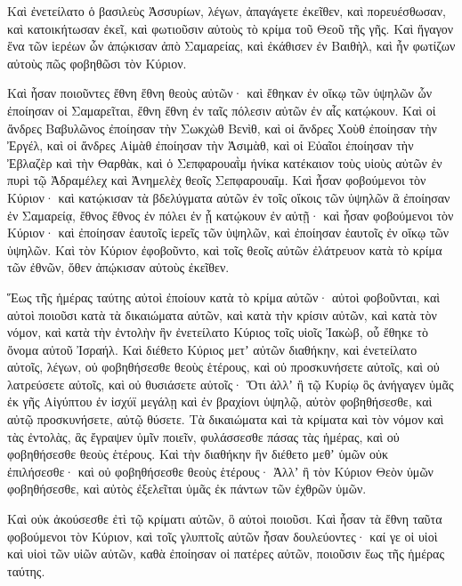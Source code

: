 {Καὶ ἐνετείλατο ὁ βασιλεὺς Ἀσσυρίων, λέγων, ἀπαγάγετε ἐκεῖθεν, καὶ πορευέσθωσαν, καὶ κατοικήτωσαν ἐκεῖ, καὶ φωτιοῦσιν αὐτοὺς τὸ κρίμα τοῦ Θεοῦ τῆς γῆς.
Καὶ ἤγαγον ἕνα τῶν ἱερέων ὧν ἀπῴκισαν ἀπὸ Σαμαρείας, καὶ ἐκάθισεν ἐν Βαιθὴλ, καὶ ἦν φωτίζων αὐτοὺς πῶς φοβηθῶσι τὸν Κύριον.
\par }{\PP {}Καὶ ἦσαν ποιοῦντες ἔθνη ἔθνη θεοὺς αὐτῶν· καὶ ἔθηκαν ἐν οἴκῳ τῶν ὑψηλῶν ὧν ἐποίησαν οἱ Σαμαρεῖται, ἔθνη ἔθνη ἐν ταῖς πόλεσιν αὐτῶν ἐν αἷς κατῴκουν.
Καὶ οἱ ἄνδρες Βαβυλῶνος ἐποίησαν τὴν Σωκχὼθ Βενὶθ, καὶ οἱ ἄνδρες Χοὺθ ἐποίησαν τὴν Ἐργέλ, καὶ οἱ ἄνδρες Αἱμὰθ ἐποίησαν τὴν Ἀσιμὰθ,
καὶ οἱ Εὐαῖοι ἐποίησαν τὴν Ἐβλαζὲρ καὶ τὴν Θαρθὰκ, καὶ ὁ Σεπφαρουαῒμ ἡνίκα κατέκαιον τοὺς υἱοὺς αὐτῶν ἐν πυρὶ τῷ Ἀδραμέλεχ καὶ Ἀνημελὲχ θεοῖς Σεπφαρουαΐμ.
Καὶ ἦσαν φοβούμενοι τὸν Κύριον· καὶ κατῴκισαν τὰ βδελύγματα αὐτῶν ἐν τοῖς οἴκοις τῶν ὑψηλῶν ἃ ἐποίησαν ἐν Σαμαρείᾳ, ἔθνος ἔθνος ἐν πόλει ἐν ᾗ κατῴκουν ἐν αὐτῇ· καὶ ἦσαν φοβούμενοι τὸν Κύριον· καὶ ἐποίησαν ἑαυτοῖς ἱερεῖς τῶν ὑψηλῶν, καὶ ἐποίησαν ἑαυτοῖς ἐν οἴκῳ τῶν ὑψηλῶν.
Καὶ τὸν Κύριον ἐφοβοῦντο, καὶ τοῖς θεοῖς αὐτῶν ἐλάτρευον κατὰ τὸ κρίμα τῶν ἐθνῶν, ὅθεν ἀπῴκισαν αὐτοὺς ἐκεῖθεν.
\par }{\PP {}Ἕως τῆς ἡμέρας ταύτης αὐτοὶ ἐποίουν κατὰ τὸ κρίμα αὐτῶν· αὐτοὶ φοβοῦνται, καὶ αὐτοὶ ποιοῦσι κατὰ τὰ δικαιώματα αὐτῶν, καὶ κατὰ τὴν κρίσιν αὐτῶν, καὶ κατὰ τὸν νόμον, καὶ κατὰ τὴν ἐντολὴν ἣν ἐνετείλατο Κύριος τοῖς υἱοῖς Ἰακὼβ, οὗ ἔθηκε τὸ ὄνομα αὐτοῦ Ἰσραήλ.
Καὶ διέθετο Κύριος μετʼ αὐτῶν διαθήκην, καὶ ἐνετείλατο αὐτοῖς, λέγων, οὐ φοβηθήσεσθε θεοὺς ἑτέρους, καὶ οὐ προσκυνήσετε αὐτοῖς, καὶ οὐ λατρεύσετε αὐτοῖς, καὶ οὐ θυσιάσετε αὐτοῖς·
Ὅτι ἀλλʼ ἢ τῷ Κυρίῳ ὃς ἀνήγαγεν ὑμᾶς ἐκ γῆς Αἰγύπτου ἐν ἰσχύϊ μεγάλῃ καὶ ἐν βραχίονι ὑψηλῷ, αὐτὸν φοβηθήσεσθε, καὶ αὐτῷ προσκυνήσετε, αὐτῷ θύσετε.
Τὰ δικαιώματα καὶ τὰ κρίματα καὶ τὸν νόμον καὶ τὰς ἐντολὰς, ἃς ἔγραψεν ὑμῖν ποιεῖν, φυλάσσεσθε πάσας τὰς ἡμέρας, καὶ οὐ φοβηθήσεσθε θεοὺς ἑτέρους.
Καὶ τὴν διαθήκην ἣν διέθετο μεθʼ ὑμῶν οὐκ ἐπιλήσεσθε· καὶ οὐ φοβηθήσεσθε θεοὺς ἑτέρους·
Ἀλλʼ ἢ τὸν Κύριον Θεὸν ὑμῶν φοβηθήσεσθε, καὶ αὐτὸς ἐξελεῖται ὑμᾶς ἐκ πάντων τῶν ἐχθρῶν ὑμῶν.
\par }{\PP {}Καὶ οὐκ ἀκούσεσθε ἐτὶ τῷ κρίματι αὐτῶν, ὃ αὐτοὶ ποιοῦσι.
Καὶ ἦσαν τὰ ἔθνη ταῦτα φοβούμενοι τὸν Κύριον, καὶ τοῖς γλυπτοῖς αὐτῶν ἦσαν δουλεύοντες· καί γε οἱ υἱοὶ καὶ υἱοὶ τῶν υἱῶν αὐτῶν, καθὰ ἐποίησαν οἱ πατέρες αὐτῶν, ποιοῦσιν ἕως τῆς ἡμέρας ταύτης.

}
